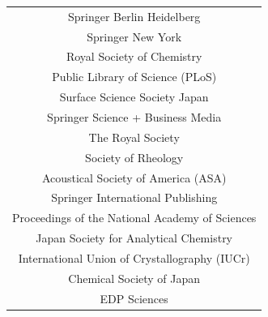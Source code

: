 \begin{table}[H]
\begin{tabular}{||c||}
Springer Berlin Heidelberg                        \\
Springer New York                                 \\
Royal Society of Chemistry                        \\
Public Library of Science (PLoS)                  \\
Surface Science Society Japan                     \\
Springer Science + Business Media                 \\
The Royal Society                                 \\
Society of Rheology                               \\
Acoustical Society of America (ASA)               \\
Springer International Publishing                 \\
Proceedings of the National Academy of Sciences   \\
Japan Society for Analytical Chemistry            \\
International Union of Crystallography (IUCr)     \\
Chemical Society of Japan                         \\
EDP Sciences                                      \\
\hline
\end{tabular}
\end{table}


